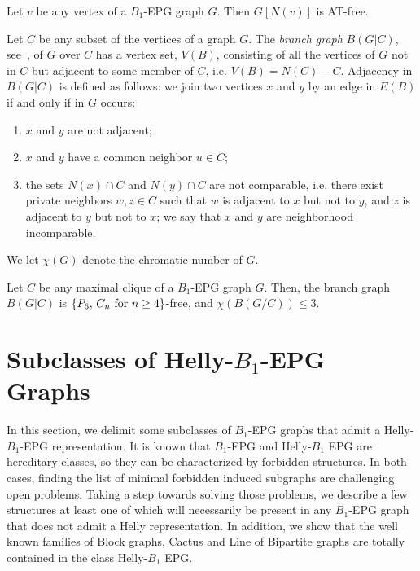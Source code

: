 \documentclass{dmgt}
\begin{document}
\begin{lemma}
 \label{l:AT-free} Let $v$ be any vertex of a $B_1$-EPG graph $G$. Then $G[N(v)]$ is AT-free.
\end{lemma}

Let $C$ be any subset of the vertices of a graph $G$. The \textit{branch graph} $B(G|C)$, see~\cite{golumbic2009}, of $G$ over $C$ has a vertex set, $V(B)$, consisting of all the vertices of $G$ not in $C$ but adjacent to some member of $C$, i.e. $V(B) = N(C) - C$. Adjacency in $B(G|C)$ is defined as follows: we join two vertices $x$ and $y$ by an edge in $E(B)$ if and only if in $G$ occurs:
\begin{enumerate}
    \item  $x$ and $y$ are not adjacent;
    \item $x$ and $y$ have a common neighbor $u \in C$;
    \item the sets $N(x) \cap C$ and $N(y) \cap C$ are not comparable, i.e. there exist private neighbors $w, z \in C$ such that $w$ is adjacent to $x$ but not to $y$, and $z$ is adjacent to $y$ but not to $x$; we say that $x$ and $y$ are neighborhood incomparable.
\end{enumerate}

We let  $\chi(G)$ denote the chromatic number of $G$. 

\begin{lemma} \label{l:branch} Let $C$ be any maximal clique of a $B_1$-EPG  graph $G$. Then, the branch graph $B(G|C)$ is $\{P_6, \, C_n \hbox{ for }  n\geq 4\}$-free, and $\chi(B(G/C))\leq 3$.
\end{lemma}




\section{Subclasses of Helly-$B_1$-EPG Graphs}

In this section, we delimit some  subclasses of $B_1$-EPG graphs that admit a Helly-$B_1$-EPG representation. It is known that $B_1$-EPG and Helly-$B_1$ EPG 
are hereditary classes, so they can  be characterized by forbidden structures. 
In both cases, finding the list of minimal forbidden induced subgraphs are challenging open problems.
Taking a step towards solving
those problems,  we describe a few structures %
at least one of which will  necessarily be present in  any $B_1$-EPG graph that does not admit a Helly representation. 
In addition,
we show that the well known families of Block graphs, Cactus and Line of Bipartite graphs are totally contained in the class Helly-$B_1$ EPG.
\end{document}
